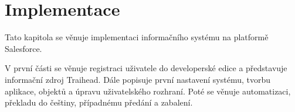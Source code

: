 \chapter{Implementace}
Tato kapitola se věnuje implementaci informačního systému na platformě Salesforce. 

V první části se věnuje registraci uživatele do developerské edice a představuje informační zdroj Traihead. Dále popisuje první nastavení systému, tvorbu aplikace, objektů a úpravu uživatelského rozhraní. Poté se věnuje automatizaci, překladu do češtiny, případnému předání a zabalení.








